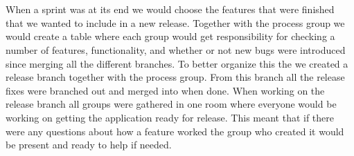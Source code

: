 \\
\\
When a sprint was at its end we would choose the features that were finished that we wanted to include in a new release.
Together with the process group we would create a table where each group would get responsibility for checking a number of features, functionality, and whether or not new bugs were introduced since merging all the different branches.
To better organize this the we created a release branch together with the process group.
From this branch all the release fixes were branched out and merged into when done.
When working on the release branch all groups were gathered in one room where everyone would be working on getting the application ready for release.
This meant that if there were any questions about how a feature worked the group who created it would be present and ready to help if needed.
